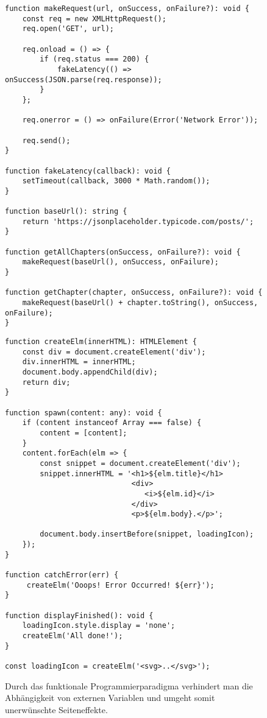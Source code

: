 \begin{figure}[H]
\begin{lstlisting}[basicstyle=\small]
function makeRequest(url, onSuccess, onFailure?): void {
    const req = new XMLHttpRequest();
    req.open('GET', url);

    req.onload = () => {
        if (req.status === 200) {
            fakeLatency(() => onSuccess(JSON.parse(req.response));
        }
    };

    req.onerror = () => onFailure(Error('Network Error'));

    req.send();
}

function fakeLatency(callback): void {
    setTimeout(callback, 3000 * Math.random());
}

function baseUrl(): string {
    return 'https://jsonplaceholder.typicode.com/posts/';
}

function getAllChapters(onSuccess, onFailure?): void {
    makeRequest(baseUrl(), onSuccess, onFailure);
}

function getChapter(chapter, onSuccess, onFailure?): void {
    makeRequest(baseUrl() + chapter.toString(), onSuccess, onFailure);
}
\end{lstlisting}
\end{figure}

\begin{figure}[H]\ContinuedFloat
\begin{lstlisting}[basicstyle=\small]
function createElm(innerHTML): HTMLElement {
    const div = document.createElement('div');
    div.innerHTML = innerHTML;
    document.body.appendChild(div);
    return div;
}

function spawn(content: any): void {
    if (content instanceof Array === false) {
        content = [content];
    }
    content.forEach(elm => {
        const snippet = document.createElement('div');
        snippet.innerHTML = '<h1>${elm.title}</h1>
                             <div>
                                <i>${elm.id}</i>
                             </div>
                             <p>${elm.body}.</p>';

        document.body.insertBefore(snippet, loadingIcon);
    });
}

function catchError(err) {
     createElm('Ooops! Error Occurred! ${err}');
}

function displayFinished(): void {
    loadingIcon.style.display = 'none';
    createElm('All done!');
}

const loadingIcon = createElm('<svg>..</svg>');
\end{lstlisting}
\caption{Durch das funktionale Programmierparadigma verhindert man die Abhängigkeit von externen Variablen und umgeht somit unerwünschte Seiteneffekte.}
\end{figure}

